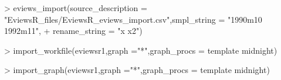 \documentclass[
]{article}
\newenvironment{Shaded}{\begin{snugshade}}{\end{snugshade}}
\newcommand{\AttributeTok}[1]{\textcolor[rgb]{0.77,0.63,0.00}{#1}}
\newcommand{\CommentTok}[1]{\textcolor[rgb]{0.56,0.35,0.01}{\textit{#1}}}
\newcommand{\ErrorTok}[1]{\textcolor[rgb]{0.64,0.00,0.00}{\textbf{#1}}}
\newcommand{\FunctionTok}[1]{\textcolor[rgb]{0.00,0.00,0.00}{#1}}
\newcommand{\NormalTok}[1]{#1}
\newcommand{\SpecialCharTok}[1]{\textcolor[rgb]{0.00,0.00,0.00}{#1}}
\newcommand{\StringTok}[1]{\textcolor[rgb]{0.31,0.60,0.02}{#1}}
\begin{document}
\begin{Shaded}
\begin{Highlighting}[]
\SpecialCharTok{\textgreater{}} \FunctionTok{eviews\_import}\NormalTok{(}\AttributeTok{source\_description =} \StringTok{"EviewsR\_files/EviewsR\_eviews\_import.csv"}\NormalTok{,}\AttributeTok{smpl\_string =} \StringTok{"1990m10 1992m11"}\NormalTok{,}
\SpecialCharTok{+} \AttributeTok{rename\_string =} \StringTok{"x x2"}\NormalTok{)}
\end{Highlighting}
\end{Shaded}

\begin{Shaded}
\begin{Highlighting}[]
\SpecialCharTok{\textgreater{}} \FunctionTok{import\_workfile}\NormalTok{(}\StringTok{\textquotesingle{}eviewsr1\textquotesingle{}}\NormalTok{,}\AttributeTok{graph =}\StringTok{"*"}\NormalTok{,}\AttributeTok{graph\_procs =} \StringTok{\textquotesingle{}template midnight\textquotesingle{}}\NormalTok{)}
\end{Highlighting}
\end{Shaded}

\begin{Shaded}
\begin{Highlighting}[]
\SpecialCharTok{\textgreater{}} \FunctionTok{import\_graph}\NormalTok{(}\StringTok{\textquotesingle{}eviewsr1\textquotesingle{}}\NormalTok{,}\AttributeTok{graph =}\StringTok{"*"}\NormalTok{,}\AttributeTok{graph\_procs =} \StringTok{\textquotesingle{}template midnight\textquotesingle{}}\NormalTok{)}
\end{Highlighting}
\end{Shaded}

\begin{Shaded}
\end{Shaded}

\begin{Shaded}
\end{Shaded}
\end{document}
